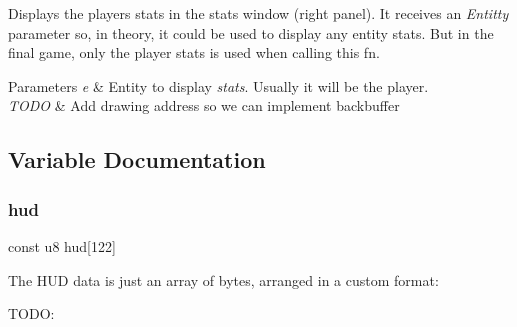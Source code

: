 Displays the player\textquotesingle{}s stats in the stats window (right panel). It receives an {\itshape Entitty} parameter so, in theory, it could be used to display any entity stats. But in the final game, only the player stats is used when calling this fn.


\begin{DoxyParams}{Parameters}
{\em e} & Entity to display {\itshape stats}. Usually it will be the player. \\
\hline
{\em T\+O\+DO} & Add drawing address so we can implement backbuffer \\
\hline
\end{DoxyParams}


\subsection{Variable Documentation}
\mbox{\label{group__user__interface_gaec0e6bac325752e9bc0a41d772670bd9}} 
\subsubsection{\texorpdfstring{hud}{hud}}
{\footnotesize\ttfamily const u8 hud\mbox{[}122\mbox{]}}

The H\+UD data is just an array of bytes, arranged in a custom format\+:
\begin{DoxyItemize}
\item T\+O\+DO\+: 
\end{DoxyItemize}